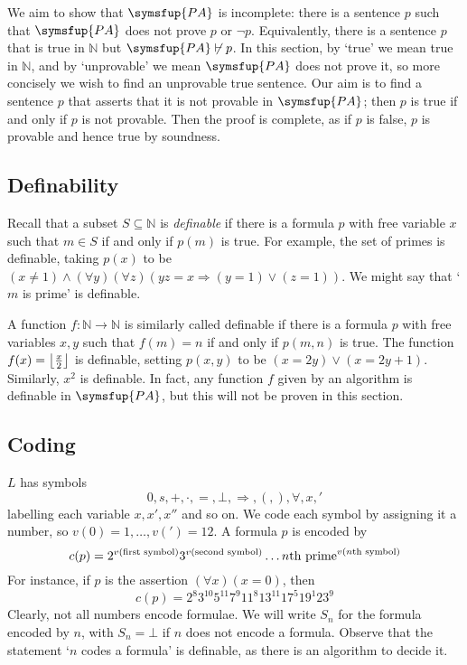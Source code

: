 We aim to show that \( \symsfup{PA} \) is incomplete: there is a sentence \( p \) such that \( \symsfup{PA} \) does not prove \( p \) or \( \neg p \).
Equivalently, there is a sentence \( p \) that is true in \( \mathbb N \) but \( \symsfup{PA} \not\vdash p \).
In this section, by `true' we mean true in \( \mathbb N \), and by `unprovable' we mean \( \symsfup{PA} \) does not prove it, so more concisely we wish to find an unprovable true sentence.
Our aim is to find a sentence \( p \) that asserts that it is not provable in \( \symsfup{PA} \); then \( p \) is true if and only if \( p \) is not provable.
Then the proof is complete, as if \( p \) is false, \( p \) is provable and hence true by soundness.

\subsection{Definability}
Recall that a subset \( S \subseteq \mathbb N \) is \emph{definable} if there is a formula \( p \) with free variable \( x \) such that \( m \in S \) if and only if \( p(m) \) is true.
For example, the set of primes is definable, taking \( p(x) \) to be \( (x \neq 1) \wedge (\forall y)(\forall z)(yz = x \Rightarrow (y = 1) \vee (z = 1)) \).
We might say that `\( m \) is prime' is definable.

A function \( f \colon \mathbb N \to \mathbb N \) is similarly called definable if there is a formula \( p \) with free variables \( x, y \) such that \( f(m) = n \) if and only if \( p(m,n) \) is true.
The function \( f(x) = \floor*{\frac{x}{2}} \) is definable, setting \( p(x,y) \) to be \( (x = 2y) \vee (x = 2y + 1) \).
Similarly, \( x^2 \) is definable.
In fact, any function \( f \) given by an algorithm is definable in \( \symsfup{PA} \), but this will not be proven in this section.

\subsection{Coding}
\( L \) has symbols
\[ 0, s, +, \cdot, =, \bot, \Rightarrow, (, ), \forall, x, ' \]
labelling each variable \( x, x', x'' \) and so on.
We code each symbol by assigning it a number, so \( v(0) = 1, \dots, v(') = 12 \).
A formula \( p \) is encoded by
\[ c(p) = 2^{v(\text{first symbol})} 3^{v(\text{second symbol})} \dots \text{\( n \)th prime}^{v(\text{\( n \)th symbol})} \]
For instance, if \( p \) is the assertion \( (\forall x)(x=0) \), then
\[ c(p) = 2^8 3^{10} 5^{11} 7^9 11^8 13^{11} 17^5 19^1 23^9 \]
Clearly, not all numbers encode formulae.
We will write \( S_n \) for the formula encoded by \( n \), with \( S_n = \bot \) if \( n \) does not encode a formula.
Observe that the statement `\( n \) codes a formula' is definable, as there is an algorithm to decide it.

